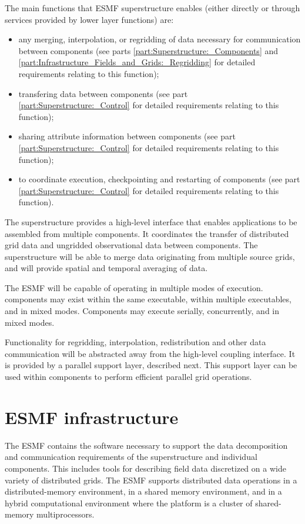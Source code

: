 \noindent The main functions that ESMF superstructure enables (either
directly or through services provided by lower layer functions) are:

\begin{itemize}
\item any merging, interpolation, or regridding 
of data necessary for communication between components
(see parts \ref{part:Superstructure:_Components} 
and \ref{part:Infrastructure_Fields_and_Grids:_Regridding} for detailed requirements relating
to this function);
\item transfering data between components (see part \ref{part:Superstructure:_Control} for detailed 
requirements relating to this function);
\item sharing attribute information between components
(see part \ref{part:Superstructure:_Control} for detailed requirements relating
to this function);
\item to coordinate execution, checkpointing and restarting of
  components (see part \ref{part:Superstructure:_Control} for detailed 
requirements relating to this function).
\end{itemize}

The superstructure provides a high-level interface that enables 
applications to be assembled from multiple components.  It coordinates
the transfer of distributed grid data and ungridded 
observational data between components.  The superstructure will be able 
to merge data originating from multiple source grids, and will 
provide spatial and temporal averaging of data.

The ESMF will be capable of operating in multiple modes of execution.
components may exist within the same executable, within multiple 
executables, and in mixed modes.  Components may execute serially, 
concurrently, and in mixed modes.  

Functionality for regridding, interpolation, redistribution and other 
data communication will be abstracted away from the high-level coupling
interface.  It is provided by a parallel support layer, described next.  
This support layer can be used within components
to perform efficient parallel grid operations.

\section{ESMF infrastructure}
\label{sec:ESMF_infrastructure}

The ESMF contains the software necessary to support the data
decomposition and communication requirements of the superstructure and
individual components.  This includes tools for describing field
data discretized on a wide variety of distributed grids.  The ESMF
supports distributed data operations in a distributed-memory environment, 
in a shared memory environment, and in a hybrid computational environment 
where the platform is a cluster of shared-memory multiprocessors.


